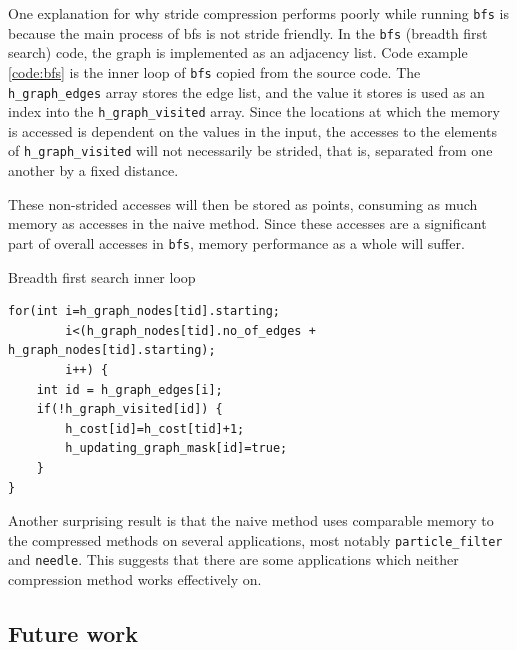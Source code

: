 \documentclass[12pt,twoside]{reedthesis}
\newenvironment{codeexample}[1][htb]
{\floatname{algorithm}{Code Example}%
	\begin{algorithm}[#1]%
	}{\end{algorithm}}
\begin{document}
		
		One explanation for why stride compression performs poorly while running \texttt{bfs} is because the main process of bfs is not stride friendly. In the \texttt{bfs} (breadth first search) code, the graph is implemented as an adjacency list. 
		Code example \ref{code:bfs} is the inner loop of \texttt{bfs} copied from the source code. The \texttt{h\_graph\_edges} array stores the edge list, and the value it stores is used as an index into the \texttt{h\_graph\_visited} array. Since the locations at which the memory is accessed is dependent on the values in the input, the accesses to the elements of \texttt{h\_graph\_visited} will not necessarily be strided, that is, separated from one another by a fixed distance. 
		
		These non-strided accesses will then be stored as points, consuming as much memory as accesses in the naive method. Since these accesses are a significant part of overall accesses in \texttt{bfs}, memory performance as a whole will suffer. 
		
\begin{codeexample}
	\caption{Breadth first search inner loop}
	\label{code:bfs}
		\begin{verbatim}
for(int i=h_graph_nodes[tid].starting; 
        i<(h_graph_nodes[tid].no_of_edges + h_graph_nodes[tid].starting); 
        i++) {
    int id = h_graph_edges[i];
    if(!h_graph_visited[id]) {
        h_cost[id]=h_cost[tid]+1;
        h_updating_graph_mask[id]=true;
    }
}
		\end{verbatim}
	\end{codeexample}
		
		Another surprising result is that the naive method uses comparable memory to the compressed methods on several applications, most notably \texttt{particle\_filter} and \texttt{needle}. This suggests that there are some applications which neither compression method works effectively on. 
		
		
		
		\subsection{Future work}
		
\end{document}
